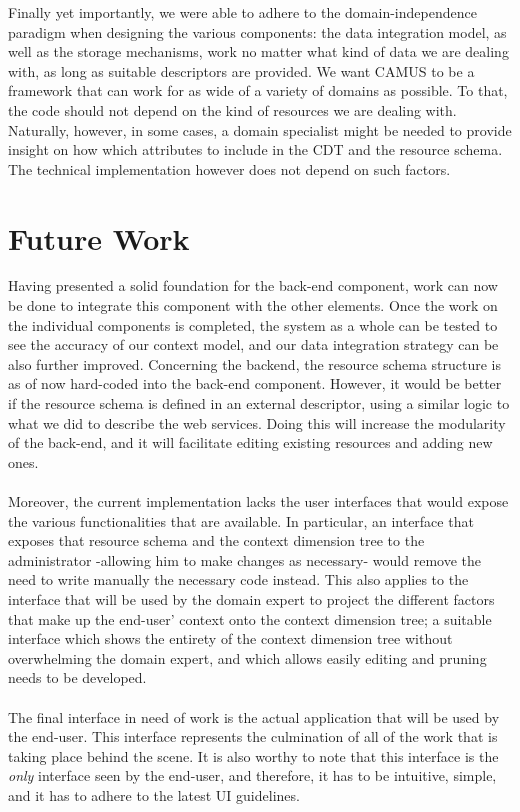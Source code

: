 Finally yet importantly, we were able to adhere to the domain-independence paradigm when designing the various components: the data integration model, as well as the storage mechanisms, work no matter what kind of data we are dealing with, as long as suitable descriptors are provided. We want CAMUS to be a framework that can work for as wide of a variety of domains as possible. To that, the code should not depend on the kind of resources we are dealing with. Naturally, however, in some cases, a domain specialist might be needed to provide insight on how which attributes to include in the CDT and the resource schema. The technical implementation however does not depend on such factors.
\section{Future Work}
Having presented a solid foundation for the back-end component, work can now be done to integrate this component with the other elements. Once the work on the individual components is completed, the system as a whole can be tested to see the accuracy of our context model, and our data integration strategy can be also further improved. Concerning the backend, the resource schema structure is as of now hard-coded into the back-end component. However, it would be better if the resource schema is defined in an external descriptor, using a similar logic to what we did to describe the web services. Doing this will increase the modularity of the back-end, and it will facilitate editing existing resources and adding new ones.\\\\
Moreover, the current implementation lacks the user interfaces that would expose the various functionalities that are available. In particular, an interface that exposes that resource schema and the context dimension tree to the administrator -allowing him to make changes as necessary- would remove the need to write manually the necessary code instead. This also applies to the interface that will be used by the domain expert to project the different factors that make up the end-user' context onto the context dimension tree; a suitable interface which shows the entirety of the context dimension tree without overwhelming the domain expert, and which allows easily editing and pruning needs to be developed.\\\\
The final interface in need of work is the actual application that will be used by the end-user. This interface represents the culmination of all of the work that is taking place behind the scene. It is also worthy to note that this interface is the \emph{only} interface seen by the end-user, and therefore, it has to be intuitive, simple, and it has to adhere to the latest UI guidelines.\\\\
